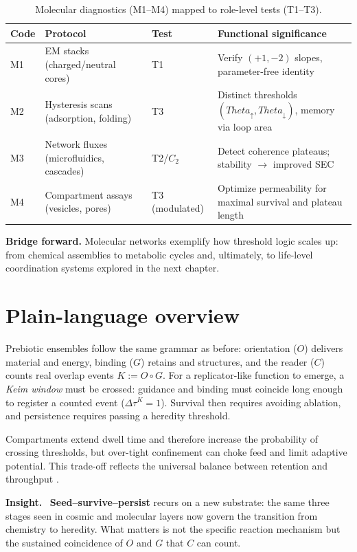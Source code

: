 \documentclass[12pt,a4paper,oneside]{scrreprt}
\def\Theta{Theta}%
\newenvironment{insight}{\par\vspace{0.5em}\noindent\textbf{Insight.}\ }{\par\vspace{0.5em}}
\begin{document}
\begin{table}[h]
\centering
\caption{Molecular diagnostics (M1--M4) mapped to role-level tests (T1--T3).}
\begin{tabular}{p{2cm} p{3cm} p{3cm} p{5cm}}
\toprule
\textbf{Code} & \textbf{Protocol} & \textbf{Test} & \textbf{Functional significance} \\
\midrule
M1 & EM stacks (charged/neutral cores) & T1 & Verify $(+1,-2)$ slopes, parameter-free identity \\
M2 & Hysteresis scans (adsorption, folding) & T3 & Distinct thresholds $(\Theta_\uparrow,\Theta_\downarrow)$, memory via loop area \\
M3 & Network fluxes (microfluidics, cascades) & T2/$C_2$ & Detect coherence plateaus; stability $\rightarrow$ improved SEC \\
M4 & Compartment assays (vesicles, pores) & T3 (modulated) & Optimize permeability for maximal survival and plateau length \\
\bottomrule
\end{tabular}
\end{table}

\noindent
\textbf{Bridge forward.} 
Molecular networks exemplify how threshold logic scales up: 
from chemical assemblies to metabolic cycles and, ultimately, 
to life-level coordination systems explored in the next chapter. 

\section*{Plain-language overview}

Prebiotic ensembles follow the same grammar as before: 
orientation ($O$) delivers material and energy, 
binding ($G$) retains and structures, 
and the reader ($C$) counts real overlap events $K:=O\!\circ G$. 
For a replicator-like function to emerge, 
a \emph{Keim window} must be crossed: 
guidance and binding must coincide long enough 
to register a counted event ($\Delta\tau^K=1$). 
Survival then requires avoiding ablation, 
and persistence requires passing a heredity threshold. 

Compartments extend dwell time and therefore 
increase the probability of crossing thresholds, 
but over-tight confinement can choke feed and 
limit adaptive potential. 
This trade-off reflects the universal balance 
between retention and throughput 
\citep{Szostak2001Protocells,Luisi2006OriginLife}.

\begin{insight}
\textbf{Seed--survive--persist} recurs on a new substrate: 
the same three stages seen in cosmic and molecular layers 
now govern the transition from chemistry to heredity. 
What matters is not the specific reaction mechanism 
but the sustained coincidence of $O$ and $G$ 
that $C$ can count.
\end{insight}
\end{document}
